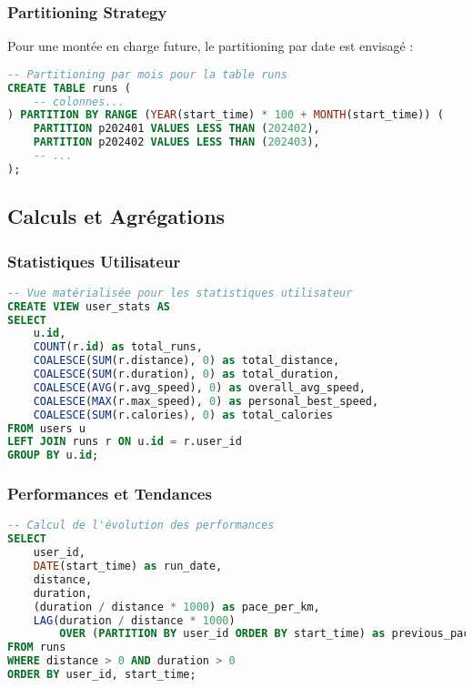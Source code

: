 \subsubsection{Partitioning Strategy}

Pour une montée en charge future, le partitioning par date est envisagé :

\begin{lstlisting}[language=sql]
-- Partitioning par mois pour la table runs
CREATE TABLE runs (
    -- colonnes...
) PARTITION BY RANGE (YEAR(start_time) * 100 + MONTH(start_time)) (
    PARTITION p202401 VALUES LESS THAN (202402),
    PARTITION p202402 VALUES LESS THAN (202403),
    -- ...
);
\end{lstlisting}

\subsection{Calculs et Agrégations}

\subsubsection{Statistiques Utilisateur}

\begin{lstlisting}[language=sql]
-- Vue matérialisée pour les statistiques utilisateur
CREATE VIEW user_stats AS
SELECT 
    u.id,
    COUNT(r.id) as total_runs,
    COALESCE(SUM(r.distance), 0) as total_distance,
    COALESCE(SUM(r.duration), 0) as total_duration,
    COALESCE(AVG(r.avg_speed), 0) as overall_avg_speed,
    COALESCE(MAX(r.max_speed), 0) as personal_best_speed,
    COALESCE(SUM(r.calories), 0) as total_calories
FROM users u
LEFT JOIN runs r ON u.id = r.user_id
GROUP BY u.id;
\end{lstlisting}

\subsubsection{Performances et Tendances}

\begin{lstlisting}[language=sql]
-- Calcul de l'évolution des performances
SELECT 
    user_id,
    DATE(start_time) as run_date,
    distance,
    duration,
    (duration / distance * 1000) as pace_per_km,
    LAG(duration / distance * 1000) 
        OVER (PARTITION BY user_id ORDER BY start_time) as previous_pace
FROM runs
WHERE distance > 0 AND duration > 0
ORDER BY user_id, start_time;
\end{lstlisting}

